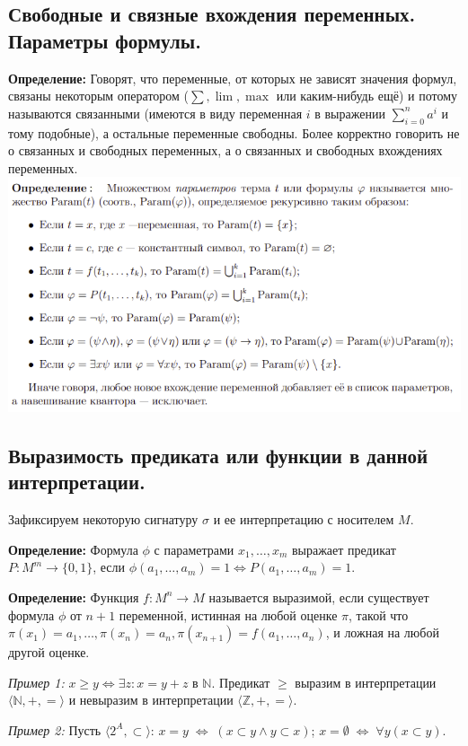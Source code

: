 \subsection{Свободные и связные вхождения переменных. Параметры формулы.}
\textbf{Определение:} Говорят, что переменные, от которых не зависят значения формул, связаны некоторым оператором ($\sum, \lim, \max$ или каким-нибудь ещё) и потому называются связанными (имеются в виду переменная $i$ в выражении $\sum_{i=0}^{n} a^{i}$ и тому подобные), а остальные переменные свободны. Более корректно говорить не о связанных и свободных переменных, а о связанных и свободных вхождениях переменных.
\newline \includegraphics[width=0.9\linewidth]{images/1_definitions_param.png}

\subsection{Выразимость предиката или функции в данной интерпретации.}
Зафиксируем некоторую сигнатуру $\sigma$ и ее интерпретацию с носителем $M$.

\textbf{Определение:} Формула $\phi$ с параметрами $x_1,\ldots,x_m$ выражает предикат $P:M^m\to \{0,1\}$, если $\phi(a_1,\ldots,a_m)=1 \Leftrightarrow P(a_1,\ldots,a_m)=1$.

\textbf{Определение:} Функция $f : M^n \to M$ называется выразимой, если существует формула $\phi$ от $n+1$ переменной, истинная на любой оценке $\pi$, такой что $\pi(x_1) = a_1, \ldots , \pi(x_n) = a_n, \pi(x_{n+1}) = f(a_1,\ldots, a_n)$, и ложная на любой другой оценке.

\textit{Пример 1:} $x\geqslant y \Leftrightarrow \exists z: x=y+z$ в $\mathbb{N}$. Предикат $\geqslant$ выразим в интерпретации $\langle\mathbb{N},+,=\rangle$ и невыразим в интерпретации $\langle\mathbb{Z},+,=\rangle$.

\textit{Пример 2:} Пусть $\langle 2^A,\subset\rangle$: \;\; $x=y \; \Leftrightarrow \; (x\subset y \land y\subset x)$; \;\; $x=\emptyset \; \Leftrightarrow \; \forall y (x\subset y)$.

